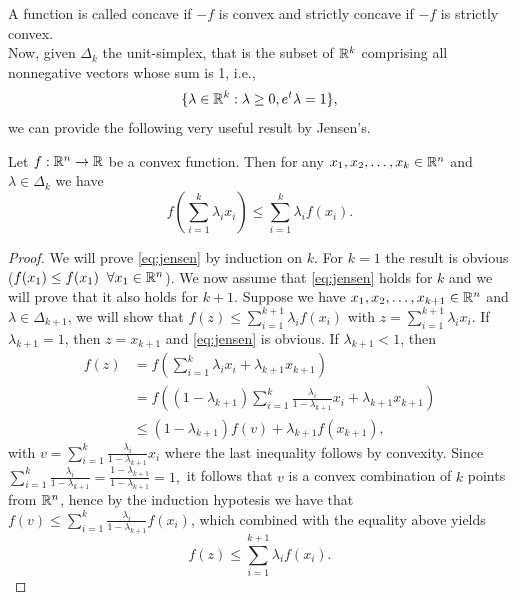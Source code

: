 \documentclass[10pt,a4paper]{article}
\begin{document}
\noindent A function is called concave if $-f$ is convex and strictly concave if $-f$ is strictly convex.\\
Now, given $\Delta_k$ the unit-simplex, that is the
subset of $\mathbb{R}^k$ comprising all nonnegative vectors whose sum is 1, i.e., 
\begin{equation*}
	\{\lambda \in \mathbb{R}^k: \lambda\geq 0, e^t\lambda=1\},
\end{equation*}
we can provide the following very useful result by Jensen's.
\begin{theorem}
	Let $f:\mathbb{R}^n\to \mathbb{R}$ be a convex function. Then for any $x_1, x_2, \dots, x_k \in \mathbb{R}^n$ and $\lambda\in \Delta_k$ we have
	\begin{equation}\label{eq:jensen}
		f\left(\sum_{i=1}^{k}\lambda_ix_i\right) \leq \sum_{i=1}^{k} \lambda_if(x_i).
	\end{equation}
\end{theorem}
\begin{proof}
	We will prove \eqref{eq:jensen} by induction on $k$. For $k=1$ the result is obvious ($f(x_1)\leq f(x_1)\;\;\forall x_1 \in \mathbb{R}^n$). We now assume that \eqref{eq:jensen} holds for $k$ and we will prove that it also holds for $k+1$. Suppose we have $x_1, x_2, \dots, x_{k+1} \in \mathbb{R}^n$ and $\lambda\in \Delta_{k+1}$, we will show that $f(z)\leq \sum_{i=1}^{k+1} \lambda_i f(x_i)$ with $z=\sum_{i=1}^{k+1} \lambda_i x_i$. If $\lambda_{k+1} =1$, then $z=x_{k+1}$ and \eqref{eq:jensen} is obvious. If $\lambda_{k+1}<1$, then
	\begin{equation*}
		\begin{split}
			f(z)& = f\left(\sum_{i=1}^k \lambda_i x_i + \lambda_{k+1}x_{k+1} \right)\\
			&= f\left((1-\lambda_{k+1})\sum_{i=1}^k \frac{\lambda_i}{1-\lambda_{k+1}} x_i + \lambda_{k+1}x_{k+1} \right)\\
			&\leq (1-\lambda_{k+1})f(v) + \lambda_{k+1} f(x_{k+1}),
		\end{split}
	\end{equation*}
	with $v= \sum_{i=1}^k\frac{\lambda_i}{1-\lambda_{k+1}} x_i$ where the last inequality follows by convexity. Since $\sum_{i=1}^k\frac{\lambda_i}{1-\lambda_{k+1}} = \frac{1-\lambda_{k+1}}{1-\lambda_{k+1}} = 1,$ it follows that $v$ is a convex combination of $k$ points from $\mathbb{R}^n$, hence by the induction hypotesis we have that $f(v)\leq \sum_{i=1}^k\frac{\lambda_i}{1-\lambda_{k+1}} f(x_i)$, which combined with the equality above yields
	\begin{equation*}
		f(z) \leq \sum_{i=1}^{k+1} \lambda_i f(x_i).
	\end{equation*}
\end{proof}
\end{document}
